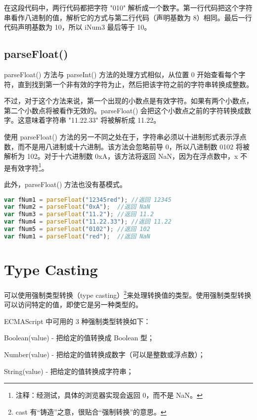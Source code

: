 在这段代码中，两行代码都把字符 "010" 解析成一个数字。第一行代码把这个字符串看作八进制的值，解析它的方式与第二行代码（声明基数为 8）相同。最后一行代码声明基数为 10，所以 iNum3 最后等于 10。




\subsection{parseFloat()}

parseFloat() 方法与 parseInt() 方法的处理方式相似，从位置 0 开始查看每个字符，直到找到第一个非有效的字符为止，然后把该字符之前的字符串转换成整数。

不过，对于这个方法来说，第一个出现的小数点是有效字符。如果有两个小数点，第二个小数点将被看作无效的。parseFloat() 会把这个小数点之前的字符转换成数字。这意味着字符串 "11.22.33" 将被解析成 11.22。

使用 parseFloat() 方法的另一不同之处在于，字符串必须以十进制形式表示浮点数，而不是用八进制或十六进制。该方法会忽略前导 0，所以八进制数 0102 将被解析为 102。对于十六进制数 0xA，该方法将返回 NaN，因为在浮点数中，x 不是有效字符\footnote{注释：经测试，具体的浏览器实现会返回 0，而不是 NaN。}。

此外，parseFloat() 方法也没有基模式。



\begin{lstlisting}[language=JavaScript]
var fNum1 = parseFloat("12345red");	//返回 12345
var fNum2 = parseFloat("0xA");	//返回 NaN
var fNum3 = parseFloat("11.2");	//返回 11.2
var fNum4 = parseFloat("11.22.33");	//返回 11.22
var fNum5 = parseFloat("0102");	//返回 102
var fNum1 = parseFloat("red");	//返回 NaN
\end{lstlisting}



\section{Type Casting}


可以使用强制类型转换（type casting）\footnote{cast 有“铸造”之意，很贴合“强制转换”的意思。}来处理转换值的类型。使用强制类型转换可以访问特定的值，即使它是另一种类型的。

ECMAScript 中可用的 3 种强制类型转换如下：

\begin{compactitem}
\item Boolean(value) - 把给定的值转换成 Boolean 型；
\item Number(value) - 把给定的值转换成数字（可以是整数或浮点数）；
\item String(value) - 把给定的值转换成字符串；
\end{compactitem}


